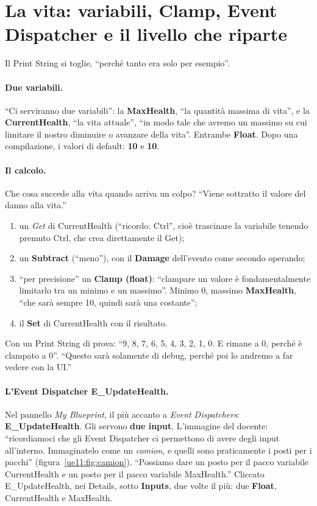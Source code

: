 \section{La vita: variabili, Clamp, Event Dispatcher e il livello che riparte}
\label{ue11:sec:vita}

Il Print String si toglie, ``perché tanto era solo per esempio''.

\paragraph{Due variabili.} ``Ci serviranno due variabili'': la \textbf{MaxHealth}, ``la
quantità massima di vita'', e la \textbf{CurrentHealth}, ``la vita attuale'', ``in modo
tale che avremo un massimo su cui limitare il nostro diminuire o avanzare della vita''.
Entrambe \textbf{Float}. Dopo una compilazione, i valori di default: \textbf{10} e
\textbf{10}.

\paragraph{Il calcolo.} Che cosa succede alla vita quando arriva un colpo? ``Viene
sottratto il valore del danno alla vita.''
\begin{enumerate}
  \item un \emph{Get} di CurrentHealth (``ricordo: Ctrl'', cioè trascinare la variabile
        tenendo premuto Ctrl, che crea direttamente il Get);
  \item un \textbf{Subtract} (``meno''), con il \textbf{Damage} dell'evento come secondo
        operando;
  \item ``per precisione'' un \textbf{Clamp (float)}: ``clampare un valore è
        fondamentalmente limitarlo tra un minimo e un massimo''. Minimo 0, massimo
        \textbf{MaxHealth}, ``che sarà sempre 10, quindi sarà una costante'';
  \item il \textbf{Set} di CurrentHealth con il risultato.
\end{enumerate}
Con un Print String di prova: ``9, 8, 7, 6, 5, 4, 3, 2, 1, 0. E rimane a 0, perché è
clampato a 0''. ``Questo sarà solamente di debug, perché poi lo andremo a far vedere con
la UI.''

\paragraph{L'Event Dispatcher E\_UpdateHealth.} Nel pannello \emph{My Blueprint}, il più
accanto a \emph{Event Dispatchers}: \textbf{E\_UpdateHealth}. Gli servono \textbf{due
input}. L'immagine del docente: ``ricordiamoci che gli Event Dispatcher ci permettono di
avere degli input all'interno. Immaginatelo come un \emph{camion}, e quelli sono
praticamente i posti per i pacchi'' (figura~\ref{ue11:fig:camion}). ``Possiamo dare un
posto per il pacco variabile CurrentHealth e un posto per il pacco variabile MaxHealth.''
Cliccato E\_UpdateHealth, nei Details, sotto \textbf{Inputs}, due volte il più: due
\textbf{Float}, CurrentHealth e MaxHealth.


